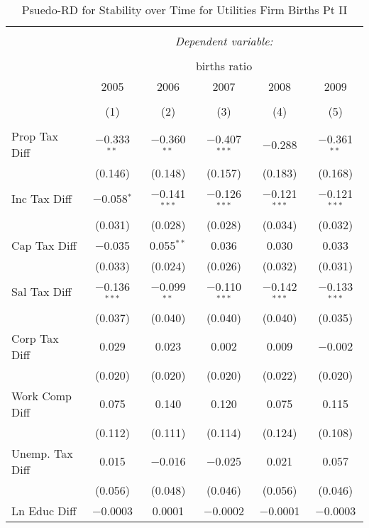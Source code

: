 
\begin{table}[!htbp] \centering 
  \caption{Psuedo-RD for Stability over Time for  Utilities Firm Births Pt II} 
  \label{22year} 
\small 
\begin{tabular}{@{\extracolsep{5pt}}lccccc} 
\\[-1.8ex]\hline 
\hline \\[-1.8ex] 
 & \multicolumn{5}{c}{\textit{Dependent variable:}} \\ 
\cline{2-6} 
\\[-1.8ex] & \multicolumn{5}{c}{births ratio} \\ 
 & 2005 & 2006 & 2007 & 2008 & 2009 \\ 
\\[-1.8ex] & (1) & (2) & (3) & (4) & (5)\\ 
\hline \\[-1.8ex] 
 Prop Tax Diff & $-$0.333$^{**}$ & $-$0.360$^{**}$ & $-$0.407$^{***}$ & $-$0.288 & $-$0.361$^{**}$ \\ 
  & (0.146) & (0.148) & (0.157) & (0.183) & (0.168) \\ 
  Inc Tax Diff & $-$0.058$^{*}$ & $-$0.141$^{***}$ & $-$0.126$^{***}$ & $-$0.121$^{***}$ & $-$0.121$^{***}$ \\ 
  & (0.031) & (0.028) & (0.028) & (0.034) & (0.032) \\ 
  Cap Tax Diff & $-$0.035 & 0.055$^{**}$ & 0.036 & 0.030 & 0.033 \\ 
  & (0.033) & (0.024) & (0.026) & (0.032) & (0.031) \\ 
  Sal Tax Diff & $-$0.136$^{***}$ & $-$0.099$^{**}$ & $-$0.110$^{***}$ & $-$0.142$^{***}$ & $-$0.133$^{***}$ \\ 
  & (0.037) & (0.040) & (0.040) & (0.040) & (0.035) \\ 
  Corp Tax Diff & 0.029 & 0.023 & 0.002 & 0.009 & $-$0.002 \\ 
  & (0.020) & (0.020) & (0.020) & (0.022) & (0.020) \\ 
  Work Comp Diff & 0.075 & 0.140 & 0.120 & 0.075 & 0.115 \\ 
  & (0.112) & (0.111) & (0.114) & (0.124) & (0.108) \\ 
  Unemp. Tax Diff & 0.015 & $-$0.016 & $-$0.025 & 0.021 & 0.057 \\ 
  & (0.056) & (0.048) & (0.046) & (0.056) & (0.046) \\ 
  Ln Educ Diff & $-$0.0003 & 0.0001 & $-$0.0002 & $-$0.0001 & $-$0.0003 \\ 

\end{tabular}
\end{table}
